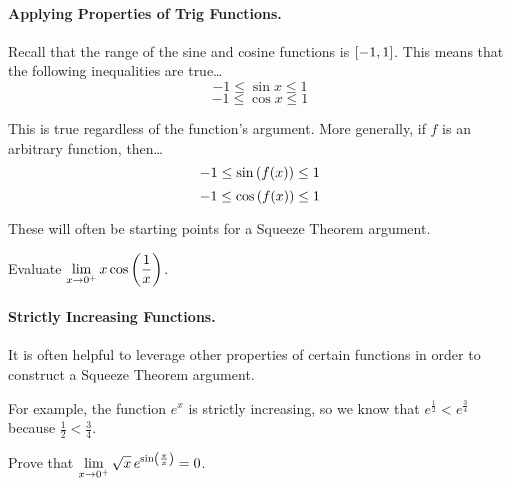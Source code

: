 \documentclass[12pt]{article}
\begin{document}
\newpage 

\paragraph{Applying Properties of Trig Functions.} Recall that the range of the sine and cosine functions is $\left[-1,1\right]$. This means that the following inequalities are true\dots
$$-1\leq\sin x\leq 1$$
$$-1\leq\cos x\leq 1$$

This is true regardless of the function's argument. More generally, if $f$ is an arbitrary function, then\dots
$$-1\leq\sin\left( f(x)\right)\leq 1$$
$$-1\leq\cos\left( f(x)\right)\leq 1$$

These will often be starting points for a Squeeze Theorem argument.

\vspace{5mm}

\Example Evaluate $\displaystyle\lim_{x\to 0^+}x\cos\left(\frac{1}{x}\right)$.

\vspace{60mm}

\paragraph{Strictly Increasing Functions.} It is often helpful to leverage other properties of certain functions in order to construct a Squeeze Theorem argument.

\vspace{3mm}


\vspace{3mm}


\vspace{3mm}

For example, the function $e^x$ is strictly increasing, so we know that $e^\frac{1}{2}<e^\frac{3}{4}$ because $\frac{1}{2}<\frac{3}{4}$.

\newpage

\Example Prove that $\displaystyle\lim_{x\to 0^+}\sqrt{x} \,e^{\sin\left(\frac{\pi}{x}\right)}=0$.
\end{document}
